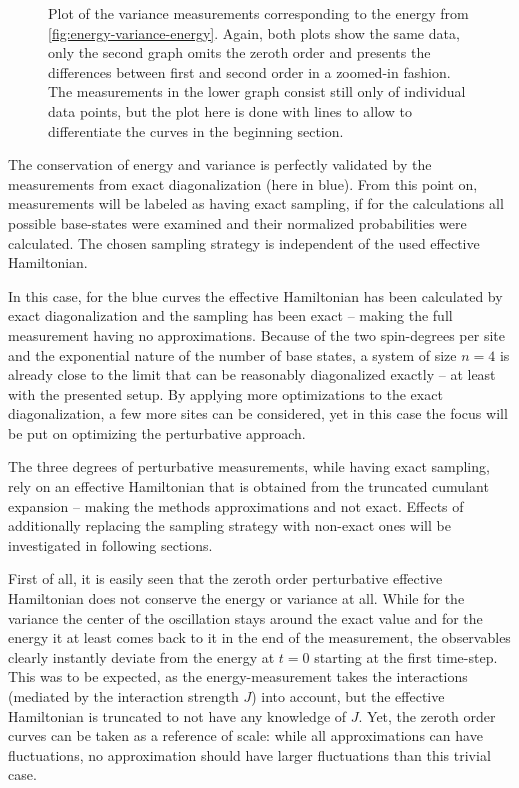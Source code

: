 \begin{figure}[htbp]
    \centering
    \caption{
            Plot of the variance measurements corresponding to the energy from \autoref{fig:energy-variance-energy}.
            Again, both plots show the same data, only the second graph omits the zeroth order and presents the differences between first and second order in a zoomed-in fashion.
            The measurements in the lower graph consist still only of individual data points, but the plot here is done with lines to allow to differentiate the curves in the beginning section.
        }
    \label{fig:energy-variance-variance}
\end{figure}

The conservation of energy and variance is perfectly validated by the measurements from exact diagonalization (here in blue).
From this point on, measurements will be labeled as having \glqq exact sampling\grqq, if for the calculations all possible base-states were examined and their normalized probabilities were calculated.
The chosen sampling strategy is independent of the used effective Hamiltonian. 

In this case, for the blue curves the effective Hamiltonian has been calculated by exact diagonalization and the sampling has been exact -- making the full measurement having no approximations.
Because of the two spin-degrees per site and the exponential nature of the number of base states, a system of size $n=4$ is already close to the limit that can be reasonably diagonalized exactly -- at least with the presented setup.
By applying more optimizations to the exact diagonalization, a few more sites can be considered, yet in this case the focus will be put on optimizing the perturbative approach.

The three degrees of perturbative measurements, while having exact sampling, rely on an effective Hamiltonian that is obtained from the truncated cumulant expansion -- making the methods approximations and not exact.
Effects of additionally replacing the sampling strategy with non-exact ones will be investigated in following sections.

First of all, it is easily seen that the zeroth order perturbative effective Hamiltonian does not conserve the energy or variance at all.
While for the variance the center of the oscillation stays around the exact value and for the energy it at least comes back to it in the end of the measurement, the observables clearly instantly deviate from the energy at $t=0$ starting at the first time-step.
This was to be expected, as the energy-measurement takes the interactions (mediated by the interaction strength $J$) into account, but the effective Hamiltonian is truncated to not have any knowledge of $J$.
Yet, the zeroth order curves can be taken as a reference of scale: while all approximations can have fluctuations, no approximation should have larger fluctuations than this trivial case.

